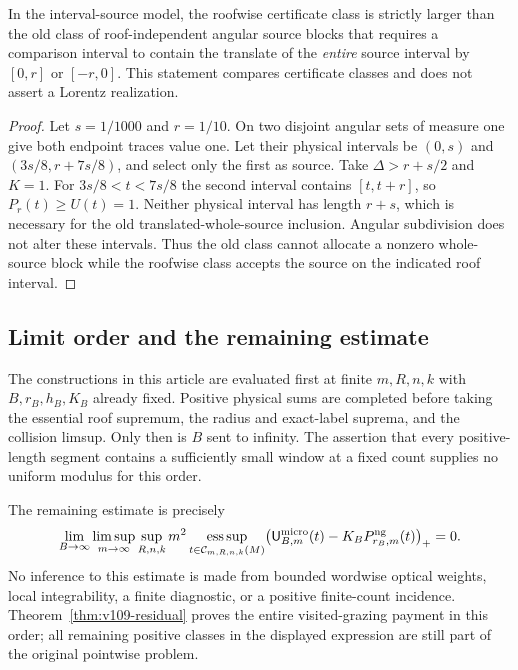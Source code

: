 \begin{proposition}
\label{prop:v109-strictness}
In the interval-source model, the roofwise certificate class is
strictly larger than the old class of roof-independent angular
source blocks that requires a comparison interval to contain the
translate of the \emph{entire} source interval by $[0,r]$ or
$[-r,0]$. This statement compares certificate classes and does not
assert a Lorentz realization.
\end{proposition}
\begin{proof}
Let $s=1/1000$ and $r=1/10$. On two disjoint angular sets of measure
one give both endpoint traces value one. Let their physical intervals
be $(0,s)$ and $(3s/8,r+7s/8)$, and select only the first as source.
Take $\Delta>r+s/2$ and $K=1$. For $3s/8<t<7s/8$ the second
interval contains $[t,t+r]$, so $P_r(t)\geq U(t)=1$.
Neither physical interval has length $r+s$, which is necessary for
the old translated-whole-source inclusion. Angular subdivision does
not alter these intervals. Thus the old class cannot allocate a
nonzero whole-source block while the roofwise class accepts the
source on the indicated roof interval.
\end{proof}

\subsection{Limit order and the remaining estimate}
The constructions in this article are evaluated first at finite
$m,R,n,k$ with $B,r_B,h_B,K_B$ already fixed. Positive physical sums
are completed before taking the essential roof supremum, the radius
and exact-label suprema, and the collision limsup. Only then is $B$
sent to infinity. The assertion that every positive-length segment
contains a sufficiently small window at a fixed count supplies no
uniform modulus for this order.

The remaining estimate is precisely
\[
 \lim_{B\to\infty}\limsup_{m\to\infty}\sup_{R,n,k}m^2
 \operatorname*{ess\,sup}_{t\in\mathcal C_{m,R,n,k}(M)}
 \bigl(\mathsf U_{B,m}^{\rm micro}(t)
                 -K_BP_{r_B,m}^{\rm ng}(t)\bigr)_+=0.
\]
No inference to this estimate is made from bounded wordwise optical
weights, local integrability, a finite diagnostic, or a positive
finite-count incidence. Theorem~\ref{thm:v109-residual} proves the
entire visited-grazing payment in this order; all remaining positive
classes in the displayed expression are still part of the original
pointwise problem.

